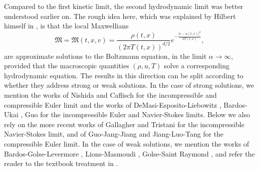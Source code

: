 \documentclass[10pt, reqno]{amsart}
\newcommand{\Mf}{\mathfrak M}
\theoremstyle{definition}
\theoremstyle{remark}
\numberwithin{equation}{section}
\begin{document}
Compared to the first kinetic limit, the second hydrodynamic limit was better understood earlier on. The rough idea here, which was explained by Hilbert himself in \cite{H12}, is that the local Maxwellians 
\begin{equation*}
\Mf=\Mf(t,x,v)=\frac{\rho(t,x)}{(2\pi T(t,x))^{d/2}}e^{-\frac{|v-u(t,x)|^2}{2T(t,x)}},
\end{equation*}
are approximate solutions to the Boltzmann equation, in the limit $\alpha\to\infty$, provided that the macroscopic quantities $(\rho, u, T)$ solve a corresponding hydrodynamic equation. The results in this direction can be split according to whether they address strong or weak solutions. In the case of strong solutions, we mention the works of Nishida \cite{Nishida78} and Caflisch \cite{Caf80} for the incompressible and compressible Euler limit and the works of DeMasi-Esposito-Liebowitz \cite{DEL89}, Bardos-Ukai \cite{BU91}, Guo \cite{Guo06} for the incompressible Euler and Navier-Stokes limits. Below we also rely on the more recent works of Gallagher and Tristani \cite{GT20} for the incompressible Navier-Stokes limit, and of Guo-Jang-Jiang \cite{GJJ10} and Jiang-Luo-Tang \cite{JLT21} for the compressible Euler limit. In the case of weak solutions, we mention the works of Bardos-Golse-Levermore \cite{BGL91, BGL93}, Lions-Masmoudi \cite{LM01, LM01-2}, Golse-Saint Raymond \cite{GSR04}, and refer the reader to the textbook treatment in \cite{Sai09}. 

\medskip 
\end{document}
